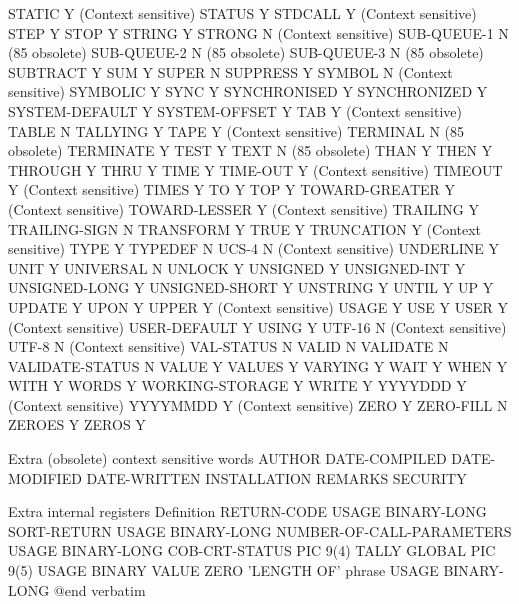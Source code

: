 STATIC				Y (Context sensitive)
STATUS				Y
STDCALL				Y (Context sensitive)
STEP				Y
STOP				Y
STRING				Y
STRONG				N (Context sensitive)
SUB-QUEUE-1			N (85 obsolete)
SUB-QUEUE-2			N (85 obsolete)
SUB-QUEUE-3			N (85 obsolete)
SUBTRACT			Y
SUM				Y
SUPER				N
SUPPRESS			Y
SYMBOL				N (Context sensitive)
SYMBOLIC			Y
SYNC				Y
SYNCHRONISED			Y
SYNCHRONIZED			Y
SYSTEM-DEFAULT			Y
SYSTEM-OFFSET			Y
TAB				Y (Context sensitive)
TABLE				N
TALLYING			Y
TAPE				Y (Context sensitive)
TERMINAL			N (85 obsolete)
TERMINATE			Y
TEST				Y
TEXT				N (85 obsolete)
THAN				Y
THEN				Y
THROUGH				Y
THRU				Y
TIME				Y
TIME-OUT			Y (Context sensitive)
TIMEOUT				Y (Context sensitive)
TIMES				Y
TO				Y
TOP				Y
TOWARD-GREATER			Y (Context sensitive)
TOWARD-LESSER			Y (Context sensitive)
TRAILING			Y
TRAILING-SIGN			N
TRANSFORM			Y
TRUE				Y
TRUNCATION			Y (Context sensitive)
TYPE				Y
TYPEDEF				N
UCS-4				N (Context sensitive)
UNDERLINE			Y
UNIT				Y
UNIVERSAL			N
UNLOCK				Y
UNSIGNED			Y
UNSIGNED-INT			Y
UNSIGNED-LONG			Y
UNSIGNED-SHORT			Y
UNSTRING			Y
UNTIL				Y
UP				Y
UPDATE				Y
UPON				Y
UPPER				Y (Context sensitive)
USAGE				Y
USE				Y
USER				Y (Context sensitive)
USER-DEFAULT			Y
USING				Y
UTF-16				N (Context sensitive)
UTF-8				N (Context sensitive)
VAL-STATUS			N
VALID				N
VALIDATE			N
VALIDATE-STATUS			N
VALUE				Y
VALUES				Y
VARYING				Y
WAIT				Y
WHEN				Y
WITH				Y
WORDS				Y
WORKING-STORAGE			Y
WRITE				Y
YYYYDDD				Y (Context sensitive)
YYYYMMDD			Y (Context sensitive)
ZERO				Y
ZERO-FILL			N
ZEROES				Y
ZEROS				Y

Extra (obsolete) context sensitive words
AUTHOR
DATE-COMPILED
DATE-MODIFIED
DATE-WRITTEN
INSTALLATION
REMARKS
SECURITY

Extra internal registers	Definition
RETURN-CODE			USAGE BINARY-LONG
SORT-RETURN			USAGE BINARY-LONG
NUMBER-OF-CALL-PARAMETERS	USAGE BINARY-LONG
COB-CRT-STATUS			PIC 9(4)
TALLY				GLOBAL PIC 9(5) USAGE BINARY VALUE ZERO
'LENGTH OF' phrase		USAGE BINARY-LONG
@end verbatim

